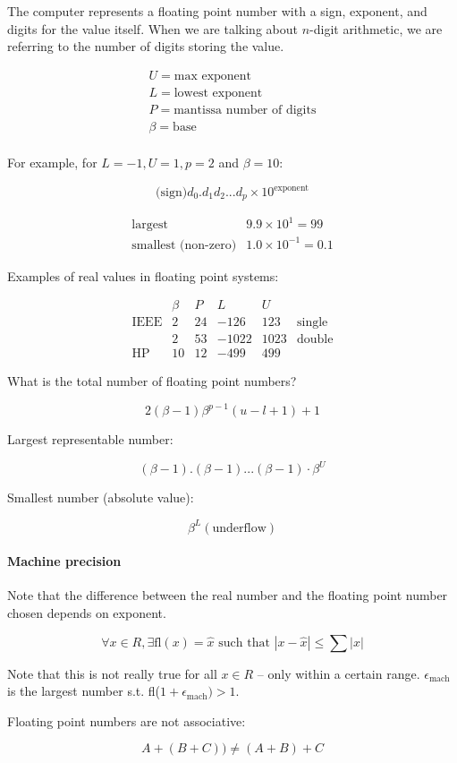 \documentclass[12pt]{article}
\newcommand{\abs}[1]{\left|#1\right|}
\newcommand{\<}{\langle}
\renewcommand{\>}{\rangle}
\begin{document}
The computer represents a floating point number with a sign, exponent, and digits for the value itself. When we are talking about $n$-digit arithmetic, we are referring to the number of digits storing the value.

\[
	\begin{matrix}
		U = \text{max exponent} \\
		L = \text{lowest exponent} \\
		P = \text{mantissa number of digits} \\
		\beta = \text{base} \\
	\end{matrix}
\]

For example, for $L=-1, U=1, p=2$ and $\beta = 10$:

\[
	\text{(sign)} d_0 . d_1 d_2 ... d_p \times 10^{\text{exponent}}
\]

\[
	\begin{matrix}
		\text{largest} & 9.9 \times 10^1 = 99\\
		\text{smallest (non-zero)} & 1.0 \times 10^{-1} = 0.1
	\end{matrix}
\]

Examples of real values in floating point systems:

\[
	\begin{matrix}
		& \beta & P & L & U \\
		\text{IEEE} & 2 & 24 & -126 & 123 & \text{single} \\
					& 2 & 53 & -1022 & 1023 & \text{double}\\ 
		\text{HP}   & 10 & 12 & -499 & 499
	\end{matrix}
\]

What is the total number of floating point numbers?

\[
	2(\beta - 1) \beta^{p-1} (u-l+1) + 1
\]

Largest representable number:

\[
	(\beta - 1).(\beta - 1)...(\beta - 1) \cdot \beta^U
\]

Smallest number (absolute value):

\[
	\beta^L (\text{underflow})
\]

\paragraph{Machine precision} Note that the difference between the real number and the floating point number chosen depends on exponent.

\[
	\forall x \in R, \exists \text{fl}(x) = \hat{x} \text{ such that } \abs{x-\hat{x}} \leq \sum \abs{x}
\]

Note that this is not really true for all $x \in R$ -- only within a certain range. $\epsilon_{\text{mach}}$ is the largest number s.t. fl($1 + \epsilon_{\text{mach}}) > 1$.

Floating point numbers are not associative:

\[
	A+(B+C)) \not= (A+B)+C
\]
\end{document}
